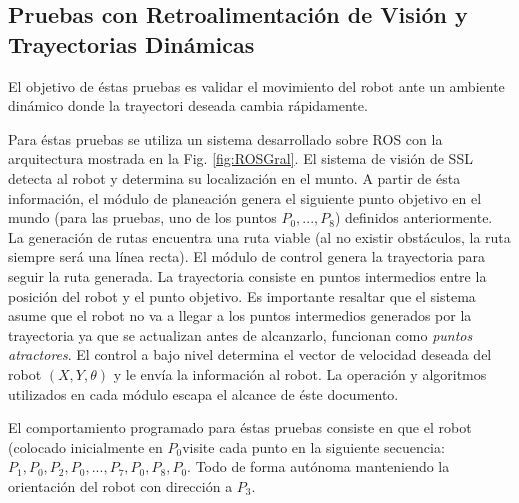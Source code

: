 \documentclass[twocolumn,10pt]{amrob}
\begin{document}
\subsection*{Pruebas con Retroalimentación de Visión y Trayectorias Dinámicas}
\label{subsec:exp_res-pruebas_vision}
El objetivo de éstas pruebas es validar el movimiento del robot ante un ambiente dinámico donde la trayectori deseada cambia rápidamente. 
\par
Para éstas pruebas se utiliza un sistema desarrollado sobre ROS con la arquitectura mostrada en la Fig. \ref{fig:ROSGral}.  El sistema de visión de SSL detecta al robot y determina su localización en el munto. A partir de ésta información, el módulo de planeación genera el siguiente punto objetivo en el mundo (para las pruebas, uno de los puntos $P_0, ..., P_8$) definidos anteriormente. La generación de rutas encuentra una ruta viable (al no existir obstáculos, la ruta siempre será una línea recta). El módulo de control genera la trayectoria para seguir la ruta generada. La trayectoria consiste en puntos intermedios entre la posición del robot y el punto objetivo. Es importante resaltar que el sistema asume que el robot no va a llegar a los puntos intermedios generados por la trayectoria ya que se actualizan antes de alcanzarlo, funcionan como \textit{puntos atractores}. El control a bajo nivel determina el vector de velocidad deseada del robot $(X, Y, \theta)$ y le envía la información al robot. La operación y algoritmos utilizados en cada módulo escapa el alcance de éste documento.
\par
El comportamiento programado para éstas pruebas consiste en que el robot (colocado inicialmente en $P_0$visite cada punto en la siguiente secuencia: $P_1, P_0, P_2, P_0, ..., P_7, P_0, P_8, P_0$. Todo de forma autónoma manteniendo la orientación del robot con dirección a $P_3$. 
\par
\end{document}
